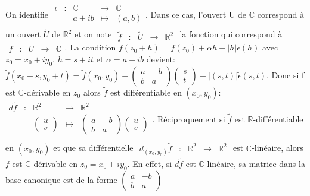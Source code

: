 \documentclass[]{report}
\begin{document}
\begin{re}{}{}
On identifie $\begin{array}{ccccc}
\iota & : & \mathbb{C} & \to & \mathbb{C} \\
 & & a+ib & \mapsto & (a,b) \\
\end{array}$. Dans ce cas, l'ouvert U de $\mathbb{C}$ correspond à un ouvert $\widetilde{U}$ de $\mathbb{R}^2$ et on note $\begin{array}{ccccc}\widetilde{f} & : & \widetilde{U} & \to & \mathbb{R}^2\end{array}$ la fonction qui correspond à $\begin{array}{ccccc}f & : & U & \to & \mathbb{C}\end{array}$. La condition $f(z_0+h)=f(z_0)+\alpha h+ |h|\epsilon(h)$ avec $z_0=x_0+iy_0$, $h=s+it$ et $\alpha = a+ib$ devient:
$\widetilde{f}(x_0+s,y_0+t)=\widetilde{f}(x_0,y_0)+\begin{pmatrix}
a & -b \\
b & a
\end{pmatrix}\begin{pmatrix}
s \\
t
\end{pmatrix}+|(s,t)|\widetilde{\epsilon}(s,t)$. Donc si f est $\mathbb{C}$-dérivable en $z_0$ alors $\widetilde{f}$ est différentiable en $(x_0,y_0)$:
$\begin{array}{ccccc}
d\widetilde{f} & : & \mathbb{R}^2 & \to & \mathbb{R}^2 \\
 & & \begin{pmatrix}
u \\
v
\end{pmatrix} & \mapsto & \begin{pmatrix}
a & -b \\
b & a
\end{pmatrix}\begin{pmatrix}
u \\
v
\end{pmatrix} \\
\end{array}$. Réciproquement si $\widetilde{f}$ est $\mathbb{R}$-différentiable en $(x_0,y_0)$ et que sa différentielle $\begin{array}{ccccc}d_{(x_0,y_0)}\widetilde{f} & : & \mathbb{R}^2 & \to & \mathbb{R}^2\end{array}$ est $\mathbb{C}$-linéaire, alors $f$ est $\mathbb{C}$-dérivable en $z_0=x_0+iy_0$. En effet, si $d\widetilde{f}$ est $\mathbb{C}$-linéaire, sa matrice dans la base canonique est de la forme $\begin{pmatrix}
a & -b\\
b & a
\end{pmatrix}$
\end{re}
\end{document}
